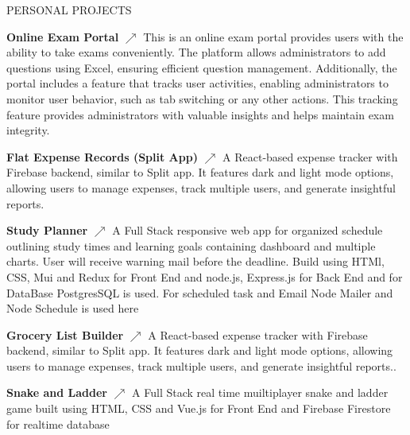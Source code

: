 \documentclass{res} %
\begin{document}
\begin{rSection}{PERSONAL PROJECTS}
\item \textbf{Online Exam Portal}
\href{https://react-online-exam-portal.vercel.app/}{\texorpdfstring{\(\nearrow\)}{nearrow}}
{
This is an online exam portal provides users with the ability to take exams conveniently. The platform allows administrators to add questions using Excel, ensuring efficient question management. Additionally, the portal includes a feature that tracks user activities, enabling administrators to monitor user behavior, such as tab switching or any other actions. This tracking feature provides administrators with valuable insights and helps maintain exam integrity.}




            
\item \textbf{Flat Expense Records (Split App)}
\href{https://github.com/Kash15if/react-flat-expense-record}{\texorpdfstring{\(\nearrow\)}{nearrow}}
{A React-based expense tracker with Firebase backend, similar to Split app. It features dark and light mode options, allowing users to manage expenses, track multiple users, and generate insightful reports.}



\item \textbf{Study Planner} 
\href{https://study-planner-phi.vercel.app/dashboard}{\texorpdfstring{\(\nearrow\)}{nearrow}}
{A Full Stack responsive web app for organized schedule outlining study times and learning goals containing dashboard and multiple charts. User will receive warning mail before the deadline. Build using HTMl, CSS, Mui and Redux for Front End and node.js, Express.js for Back End and for DataBase PostgresSQL is used. For scheduled task and Email Node Mailer and Node Schedule is used here}


\item {\bf Grocery List Builder}
\href{https://react-grocery-list-firebase.vercel.app/}{\texorpdfstring{\(\nearrow\)}{nearrow}}  {A React-based expense tracker with Firebase backend, similar to Split app. It features dark and light mode options, allowing users to manage expenses, track multiple users, and generate insightful reports..}


\item {\bf Snake and Ladder}
\href{https://vue-snake-ladder.vercel.app/}{\texorpdfstring{\(\nearrow\)}{nearrow}}
{A Full Stack real time muiltiplayer snake and ladder game built using HTML, CSS and Vue.js for Front End and Firebase Firestore for realtime database}


\end{rSection}
\end{document}

